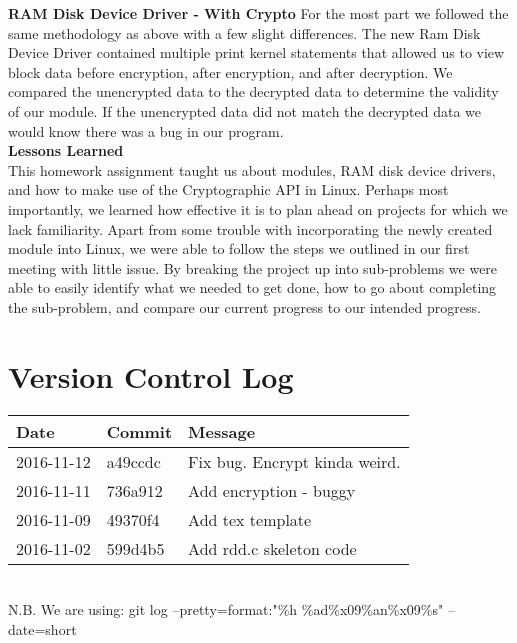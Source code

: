 \documentclass[letterpaper,10pt,draftclsnofoot,titlepage,onecolumn]{IEEEtran}
\begin{document}
 		\textbf{RAM Disk Device Driver - With Crypto}
 		For the most part we followed the same methodology as above with a few slight differences. 
 		The new Ram Disk Device Driver contained multiple print kernel statements that allowed us to view block data before encryption, after encryption, and after decryption. 
 		We compared the unencrypted data to the decrypted data to determine the validity of our module. 
 		If the unencrypted data did not match the decrypted data we would know there was a bug in our program. 
 		\\ 
	\textbf{Lessons Learned}\\
This homework assignment taught us about modules, RAM disk device drivers, and how to make use of the Cryptographic API in Linux. 
Perhaps most importantly, we learned how effective it is to plan ahead on projects for which we lack familiarity. 
Apart from some trouble with incorporating the newly created module into Linux, we were able to follow the steps we outlined in our first meeting with little issue. 
By breaking the project up into sub-problems we were able to easily identify what we needed to get done, how to go about completing the sub-problem, and compare our current progress to our intended progress.
		\\

	\clearpage

	\section{Version Control Log}
	
\begin{center}

\begin{tabular}{| m{2cm} | m{8cm} | m{4cm} | } 
\hline
 Date & Commit & Message \\ [0.5ex] 
 \hline\hline
  2016-11-12 & a49ccdc & Fix bug. Encrypt kinda weird. \\
 \hline
  2016-11-11 & 736a912 & Add encryption - buggy \\
 \hline
  2016-11-09 & 49370f4 & Add tex template \\
 \hline
   2016-11-02 & 599d4b5 & Add rdd.c skeleton code \\
 \hline
 
\end{tabular}

\end{center}
\hfill\\
N.B. We are using: git log --pretty=format:"\%h \%ad\%x09\%an\%x09\%s" --date=short
	
\end{document}
